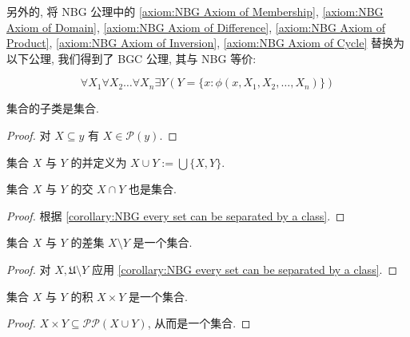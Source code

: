 另外的, 将 NBG 公理中的 \ref{axiom:NBG Axiom of Membership}, \ref{axiom:NBG Axiom of Domain},
\ref{axiom:NBG Axiom of Difference}, \ref{axiom:NBG Axiom of Product}, \ref{axiom:NBG Axiom of Inversion},
\ref{axiom:NBG Axiom of Cycle} 替换为以下公理, 我们得到了 BGC 公理, 其与 NBG 等价:

\begin{axiom*}
    \label {axiom:BG Axiom of Comprehension}
    \[
        \forall X_1 \forall X_2 \dots \forall X_n \exists Y (Y = \{x : \phi (x,X_1,X_2, \dots,X_n)\})
    \]
\end{axiom*}

\begin{corollary}
    集合的子类是集合.

    \begin{proof}
        对 \(X \subseteq y\) 有 \(X \in \mathcal{P} (y)\).
    \end{proof}
\end{corollary}

\begin{definition}
    \label {definition:union of two sets}
    集合 \(X\) 与 \(Y\) 的并定义为 \(X \cup Y := \bigcup \{X,Y\}\).
\end{definition}

\begin{definition}
    \label {definition:intersection of two sets}
    集合 \(X\) 与 \(Y\) 的交 \(X \cap Y\) 也是集合.

    \begin{proof}
        根据 \ref{corollary:NBG every set can be separated by a class}.
    \end{proof}
\end{definition}

\begin{definition}
    \label {definition:difference of two sets}
    集合 \(X\) 与 \(Y\) 的差集 \(X \setminus Y\) 是一个集合.

    \begin{proof}
        对 \(X, \mathfrak{U} \setminus Y\) 应用 \ref{corollary:NBG every set can be separated by a class}.
    \end{proof}
\end{definition}

\begin{definition}
    \label {definition:product of two sets}
    集合 \(X\) 与 \(Y\) 的积 \(X \times Y\) 是一个集合.

    \begin{proof}
        \(X \times Y \subseteq \mathcal{P} \mathcal{P} (X \cup Y)\), 从而是一个集合.
    \end{proof}
\end{definition}

